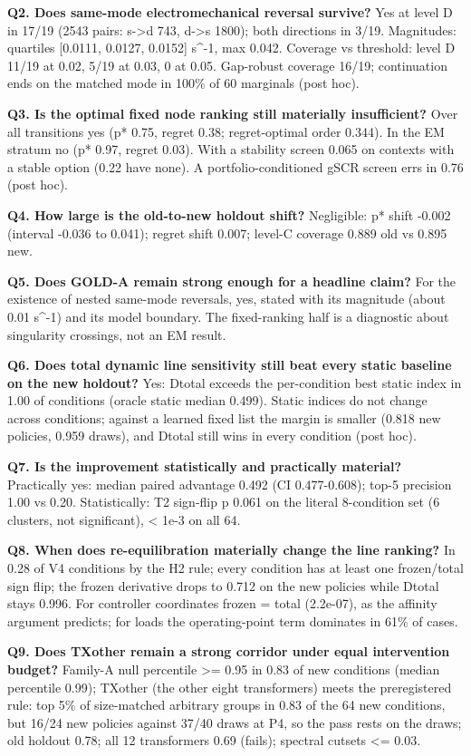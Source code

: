 \documentclass[10pt,a4paper]{article}
\begin{document}
\textbf{Q2. Does same-mode electromechanical reversal survive?} Yes at level D in 17/19 (2543 pairs: s->d 743, d->s 1800); both directions in 3/19. Magnitudes: quartiles [0.0111, 0.0127, 0.0152] s\textasciicircum{}-1, max 0.042. Coverage vs threshold: level D 11/19 at 0.02, 5/19 at 0.03, 0 at 0.05. Gap-robust coverage 16/19; continuation ends on the matched mode in 100\% of 60 marginals (post hoc).

\textbf{Q3. Is the optimal fixed node ranking still materially insufficient?} Over all transitions yes (p* 0.75, regret 0.38; regret-optimal order 0.344). In the EM stratum no (p* 0.97, regret 0.03). With a stability screen 0.065 on contexts with a stable option (0.22 have none). A portfolio-conditioned gSCR screen errs in 0.76 (post hoc).

\textbf{Q4. How large is the old-to-new holdout shift?} Negligible: p* shift -0.002 (interval -0.036 to 0.041); regret shift 0.007; level-C coverage 0.889 old vs 0.895 new.

\textbf{Q5. Does GOLD-A remain strong enough for a headline claim?} For the existence of nested same-mode reversals, yes, stated with its magnitude (about 0.01 s\textasciicircum{}-1) and its model boundary. The fixed-ranking half is a diagnostic about singularity crossings, not an EM result.

\textbf{Q6. Does total dynamic line sensitivity still beat every static baseline on the new holdout?} Yes: Dtotal exceeds the per-condition best static index in 1.00 of conditions (oracle static median 0.499). Static indices do not change across conditions; against a learned fixed list the margin is smaller (0.818 new policies, 0.959 draws), and Dtotal still wins in every condition (post hoc).

\textbf{Q7. Is the improvement statistically and practically material?} Practically yes: median paired advantage 0.492 (CI 0.477-0.608); top-5 precision 1.00 vs 0.20. Statistically: T2 sign-flip p 0.061 on the literal 8-condition set (6 clusters, not significant), < 1e-3 on all 64.

\textbf{Q8. When does re-equilibration materially change the line ranking?} In 0.28 of V4 conditions by the H2 rule; every condition has at least one frozen/total sign flip; the frozen derivative drops to 0.712 on the new policies while Dtotal stays 0.996. For controller coordinates frozen = total (2.2e-07), as the affinity argument predicts; for loads the operating-point term dominates in 61\% of cases.

\textbf{Q9. Does TXother remain a strong corridor under equal intervention budget?} Family-A null percentile >= 0.95 in 0.83 of new conditions (median percentile 0.99); TXother (the other eight transformers) meets the preregistered rule: top 5\% of size-matched arbitrary groups in 0.83 of the 64 new conditions, but 16/24 new policies against 37/40 draws at P4, so the pass rests on the draws; old holdout 0.78; all 12 transformers 0.69 (fails); spectral cutsets <= 0.03.
\end{document}
